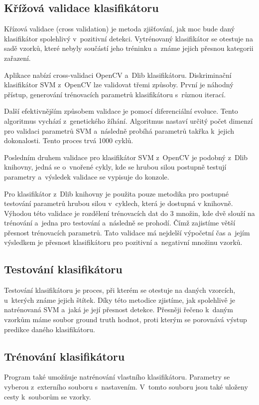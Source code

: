 \subsection{Křížová validace klasifikátoru}
Křízová validace (cross validation) je metoda zjišťování, jak moc bude daný klasifikátor spolehlivý v~pozitivní detekci. Vytrénovaný klasifikátor se otestuje na sadě vzorků, které nebyly součástí jeho tréninku a~známe jejich přesnou kategorii zařazení.

Aplikace nabízí cross-validaci OpenCV a~Dlib klasifikátoru. Diskriminační klasifikátor SVM z~OpenCV lze validovat třemi způsoby. První je náhodný přístup, generování trénovacích parametrů klasifikátoru s~různou iterací.

Další efektivnějším způsobem validace je pomocí diferenciální evoluce. Tento algoritmus vychází z~genetického žíhání. Algoritmus nastaví určitý počet dimenzí pro validaci parametrů SVM a~následně probíhá  parametrů takřka k~jejich dokonalosti. Tento proces trvá 1000 cyklů.

Posledním druhem validace pro klasifikátor SVM z~OpenCV je podobný z~Dlib knihovny, jedná se o~vnořené cykly, kde se hrubou silou postupně testují parametry a~výsledek validace se vypisuje do konzole. 

Pro klasifikátor z~Dlib knihovny je použita pouze metodika pro postupné testování parametrů hrubou silou v~cyklech, která je dostupná v knihovně. Výhodou této validace je rozdělení trénovacích dat do 3 množin, kde dvě slouží na trénování a~jedna pro testování a~následně se prohodí. Čímž zajistíme větší přesnost trénovacích parametrů. Tato validace má nejdelší výpočetní čas a~jejím výsledkem je přesnost klasifikátoru pro pozitivní a~negativní množinu vzorků.

\subsection{Testování klasifikátoru}
Testování klasifikátoru je proces, při kterém se otestuje na daných vzorcích, u~kterých známe jejich štítek. Díky této metodice zjistíme, jak spolehlivě je natrénovaná SVM a~jaká je její přesnost detekce. Přesněji řečeno k~daným vzorkům máme soubor ground truth hodnot, proti kterým se porovnává výstup predikce daného klasifikátoru. 

\subsection{Trénování klasifikátoru}
Program také umožňuje natrénování vlastního klasifikátoru. Parametry se vyberou z~externího souboru s~nastavením. V~tomto souboru jsou také uloženy cesty k~souborům se vzorky. 

